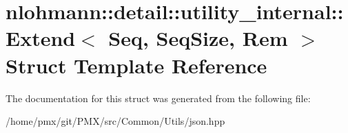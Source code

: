 \hypertarget{structnlohmann_1_1detail_1_1utility__internal_1_1Extend}{}\section{nlohmann\+:\+:detail\+:\+:utility\+\_\+internal\+:\+:Extend$<$ Seq, Seq\+Size, Rem $>$ Struct Template Reference}
\label{structnlohmann_1_1detail_1_1utility__internal_1_1Extend}


The documentation for this struct was generated from the following file\+:\begin{DoxyCompactItemize}
\item 
/home/pmx/git/\+P\+M\+X/src/\+Common/\+Utils/json.\+hpp\end{DoxyCompactItemize}
